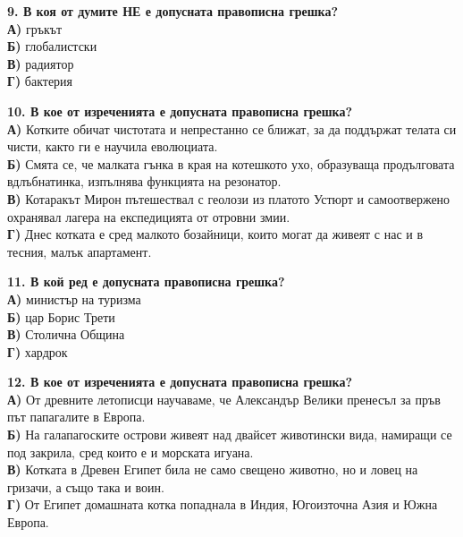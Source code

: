 \documentclass[12pt,a4paper]{article}
\begin{document}
\vspace{0.6cm}

\noindent
\textbf{9. В коя от думите НЕ е допусната правописна грешка?} \\
\noindent
\textbf{А)} гръкът \\
\textbf{Б)} глобалистски \\
\textbf{В)} радиятор \\
\textbf{Г)} бактерия

\vspace{0.6cm}

\noindent
\textbf{10. В кое от изреченията е допусната правописна грешка?} \\
\noindent
\textbf{А)} Котките обичат чистотата и непрестанно се ближат, за да поддържат телата си чисти, както ги е научила еволюциата. \\
\textbf{Б)} Смята се, че малката гънка в края на котешкото ухо, образуваща продълговата вдлъбнатинка, изпълнява функцията на резонатор. \\
\textbf{В)} Котаракът Мирон пътешествал с геолози из платото Устюрт и самоотвержено охранявал лагера на експедицията от отровни змии. \\
\textbf{Г)} Днес котката е сред малкото бозайници, които могат да живеят с нас и в тесния, малък апартамент.

\vspace{0.6cm}

\noindent
\textbf{11. В кой ред е допусната правописна грешка?} \\
\noindent
\textbf{А)} министър на туризма \\
\textbf{Б)} цар Борис Трети \\
\textbf{В)} Столична Община \\
\textbf{Г)} хардрок

\vspace{0.6cm}

\noindent
\textbf{12. В кое от изреченията е допусната правописна грешка?} \\
\noindent
\textbf{А)} От древните летописци научаваме, че Александър Велики пренесъл за пръв път папагалите в Европа. \\
\textbf{Б)} На галапагоските острови живеят над двайсет животински вида, намиращи се под закрила, сред които е и морската игуана. \\
\textbf{В)} Котката в Древен Египет била не само свещено животно, но и ловец на гризачи, а също така и воин. \\
\textbf{Г)} От Египет домашната котка попаднала в Индия, Югоизточна Азия и Южна Европа.
\end{document}
